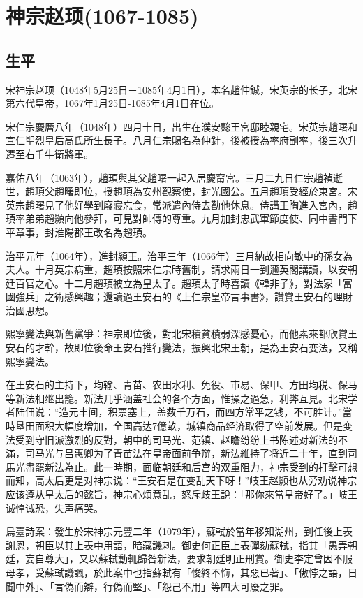 
\section{神宗赵顼\tiny(1067-1085)}

\subsection{生平}

宋神宗赵顼（1048年5月25日－1085年4月1日），本名趙仲鍼，宋英宗的长子，北宋第六代皇帝，1067年1月25日-1085年4月1日在位。

宋仁宗慶曆八年（1048年）四月十日，出生在濮安懿王宮邸睦親宅。宋英宗趙曙和宣仁聖烈皇后高氏所生長子。八月仁宗賜名為仲針，後被授為率府副率，後三次升遷至右千牛衛將軍。

嘉佑八年（1063年），趙頊與其父趙曙一起入居慶甯宮。三月二九日仁宗趙禎逝世，趙頊父趙曙即位，授趙頊為安州觀察使，封光國公。五月趙頊受經於東宮。宋英宗趙曙見了他好學到廢寢忘食，常派遣內侍去勸他休息。侍講王陶進入宮內，趙頊率弟弟趙顥向他參拜，可見對師傅的尊重。九月加封忠武軍節度使、同中書門下平章事，封淮陽郡王改名為趙頊。

治平元年（1064年），進封潁王。治平三年（1066年）三月納故相向敏中的孫女為夫人。十月英宗病重，趙頊按照宋仁宗時舊制，請求兩日一到邇英閣講讀，以安朝廷百官之心。十二月趙頊被立為皇太子。趙頊太子時喜讀《韓非子》，對法家「富國強兵」之術感興趣；還讀過王安石的《上仁宗皇帝言事書》，讚賞王安石的理財治國思想。

熙寧變法與新舊黨爭：神宗即位後，對北宋積貧積弱深感憂心，而他素來都欣賞王安石的才幹，故即位後命王安石推行變法，振興北宋王朝，是為王安石变法，又稱熙寧變法。

在王安石的主持下，均输、青苗、农田水利、免役、市易、保甲、方田均税、保马等新法相继出籠。新法几乎涵盖社会的各个方面，惟操之過急，利弊互見。北宋学者陆佃说：“造元丰间，积票塞上，盖数千万石，而四方常平之钱，不可胜计。”當時垦田面积大幅度增加，全国高达7億畝，城镇商品经济取得了空前发展。但是变法受到守旧派激烈的反對，朝中的司马光、范镇、赵瞻纷纷上书陈述对新法的不滿，司马光与吕惠卿为了青苗法在皇帝面前争辩，新法維持了将近二十年，直到司馬光盡罷新法為止。此一時期，面临朝廷和后宫的双重阻力，神宗受到的打擊可想而知，高太后更是对神宗说：“王安石是在变乱天下呀！”岐王赵颢也从旁劝说神宗应该遵从皇太后的懿旨，神宗心烦意乱，怒斥歧王說：「那你來當皇帝好了。」岐王诚惶诚恐，失声痛哭。

烏臺詩案：發生於宋神宗元豐二年（1079年），蘇軾於當年移知湖州，到任後上表謝恩，朝臣以其上表中用語，暗藏譏刺。御史何正臣上表彈劾蘇軾，指其「愚弄朝廷，妄自尊大」，又以蘇軾動輒歸咎新法，要求朝廷明正刑賞。御史李定曾因不服母孝，受蘇軾譏諷，於此案中也指蘇軾有「悛終不悔，其惡已著」、「傲悖之語，日聞中外」、「言偽而辯，行偽而堅」、「怨己不用」等四大可廢之罪。

